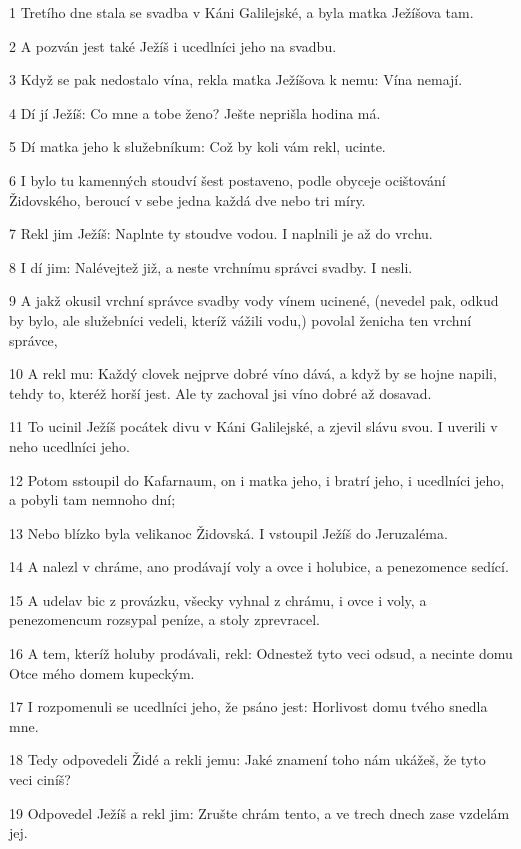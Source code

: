 \par 1 Tretího dne stala se svadba v Káni Galilejské, a byla matka Ježíšova tam.
\par 2 A pozván jest také Ježíš i ucedlníci jeho na svadbu.
\par 3 Když se pak nedostalo vína, rekla matka Ježíšova k nemu: Vína nemají.
\par 4 Dí jí Ježíš: Co mne a tobe ženo? Ješte neprišla hodina má.
\par 5 Dí matka jeho k služebníkum: Což by koli vám rekl, ucinte.
\par 6 I bylo tu kamenných stoudví šest postaveno, podle obyceje ocištování Židovského, beroucí v sebe jedna každá dve nebo tri míry.
\par 7 Rekl jim Ježíš: Naplnte ty stoudve vodou. I naplnili je až do vrchu.
\par 8 I dí jim: Nalévejtež již, a neste vrchnímu správci svadby. I nesli.
\par 9 A jakž okusil vrchní správce svadby vody vínem ucinené, (nevedel pak, odkud by bylo, ale služebníci vedeli, kteríž vážili vodu,) povolal ženicha ten vrchní správce,
\par 10 A rekl mu: Každý clovek nejprve dobré víno dává, a když by se hojne napili, tehdy to, kteréž horší jest. Ale ty zachoval jsi víno dobré až dosavad.
\par 11 To ucinil Ježíš pocátek divu v Káni Galilejské, a zjevil slávu svou. I uverili v neho ucedlníci jeho.
\par 12 Potom sstoupil do Kafarnaum, on i matka jeho, i bratrí jeho, i ucedlníci jeho, a pobyli tam nemnoho dní;
\par 13 Nebo blízko byla velikanoc Židovská. I vstoupil Ježíš do Jeruzaléma.
\par 14 A nalezl v chráme, ano prodávají voly a ovce i holubice, a penezomence sedící.
\par 15 A udelav bic z provázku, všecky vyhnal z chrámu, i ovce i voly, a penezomencum rozsypal peníze, a stoly zprevracel.
\par 16 A tem, kteríž holuby prodávali, rekl: Odnestež tyto veci odsud, a necinte domu Otce mého domem kupeckým.
\par 17 I rozpomenuli se ucedlníci jeho, že psáno jest: Horlivost domu tvého snedla mne.
\par 18 Tedy odpovedeli Židé a rekli jemu: Jaké znamení toho nám ukážeš, že tyto veci ciníš?
\par 19 Odpovedel Ježíš a rekl jim: Zrušte chrám tento, a ve trech dnech zase vzdelám jej.
